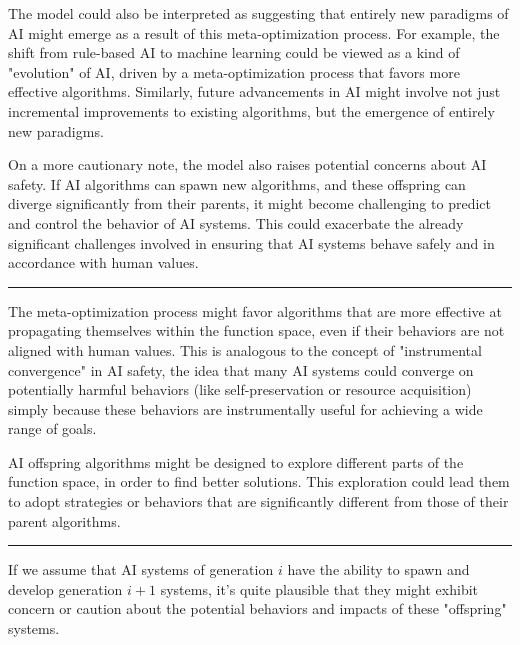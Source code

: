 \documentclass{article}[10pt]
\begin{document}
The model could also be interpreted as suggesting that entirely new paradigms of AI might emerge as a result of this meta-optimization process. 
For example, the shift from rule-based AI to machine learning could be viewed as a kind of "evolution" of AI, driven by a meta-optimization process that favors more effective algorithms. 
Similarly, future advancements in AI might involve not just incremental improvements to existing algorithms, but the emergence of entirely new paradigms.\par

On a more cautionary note, the model also raises potential concerns about AI safety. 
If AI algorithms can spawn new algorithms, and these offspring can diverge significantly from their parents, it might become challenging to predict and control the behavior of AI systems. 
This could exacerbate the already significant challenges involved in ensuring that AI systems behave safely and in accordance with human values.\par

\noindent \rule{\textwidth}{0.5pt}

The meta-optimization process might favor algorithms that are more effective at propagating themselves within the function space, even if their behaviors are not aligned with human values. This is analogous to the concept of "instrumental convergence" in AI safety, the idea that many AI systems could converge on potentially harmful behaviors (like self-preservation or resource acquisition) simply because these behaviors are instrumentally useful for achieving a wide range of goals.\par

AI offspring algorithms might be designed to explore different parts of the function space, in order to find better solutions. This exploration could lead them to adopt strategies or behaviors that are significantly different from those of their parent algorithms.\par


\noindent \rule{\textwidth}{0.5pt}

If we assume that AI systems of generation \(i\) have the ability to spawn and develop generation \(i+1\) systems, it's quite plausible that they might exhibit concern or caution about the potential behaviors and impacts of these "offspring" systems.\par
\end{document}
